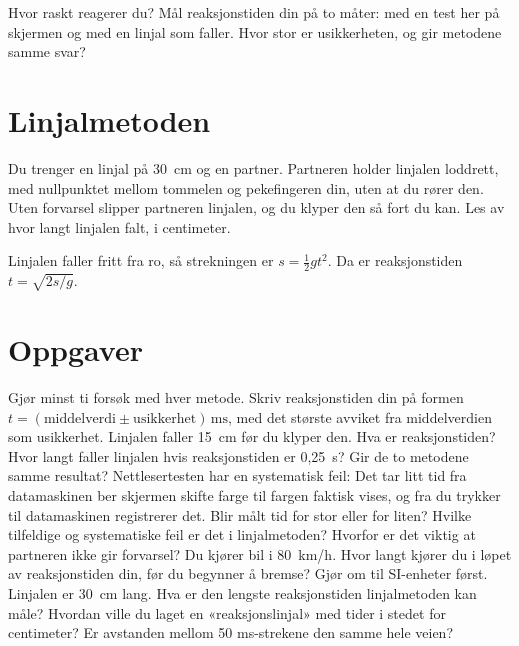 \documentclass[11pt]{article}
\begin{document}

Hvor raskt reagerer du? Mål reaksjonstiden din på to måter: med en test her på skjermen og med en linjal som faller. Hvor stor er usikkerheten, og gir metodene samme svar?

\section*{Linjalmetoden}

Du trenger en linjal på 30~cm og en partner. Partneren holder linjalen loddrett, med nullpunktet mellom tommelen og pekefingeren din, uten at du rører den. Uten forvarsel slipper partneren linjalen, og du klyper den så fort du kan. Les av hvor langt linjalen falt, i centimeter.

Linjalen faller fritt fra ro, så strekningen er $s = \tfrac{1}{2}gt^{2}$. Da er reaksjonstiden $t = \sqrt{2s/g}$.

\section*{Oppgaver}

\begin{oppgaveliste}
\oppgave {}Gjør minst ti forsøk med hver metode. Skriv reaksjonstiden din på formen $t = (\text{middelverdi} \pm \text{usikkerhet})\,\mathrm{ms}$, med det største avviket fra middelverdien som usikkerhet.
\svar
\oppgave {}Linjalen faller 15~cm før du klyper den. Hva er reaksjonstiden? Hvor langt faller linjalen hvis reaksjonstiden er 0,25~s?
\svar
\oppgave {}Gir de to metodene samme resultat? Nettlesertesten har en systematisk feil: Det tar litt tid fra datamaskinen ber skjermen skifte farge til fargen faktisk vises, og fra du trykker til datamaskinen registrerer det. Blir målt tid for stor eller for liten?
\svar
\oppgave {}Hvilke tilfeldige og systematiske feil er det i linjalmetoden? Hvorfor er det viktig at partneren ikke gir forvarsel?
\svar
\oppgave {}Du kjører bil i 80~km/h. Hvor langt kjører du i løpet av reaksjonstiden din, før du begynner å bremse? Gjør om til SI-enheter først.
\svar
\oppgave {}Linjalen er 30~cm lang. Hva er den lengste reaksjonstiden linjalmetoden kan måle? Hvordan ville du laget en «reaksjonslinjal» med tider i stedet for centimeter? Er avstanden mellom 50 ms-strekene den samme hele veien?
\svar
\end{oppgaveliste}
\end{document}
